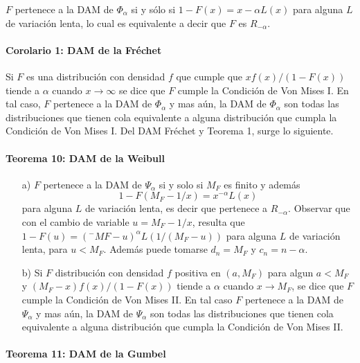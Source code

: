 \documentclass[
  oneside]{book}
\begin{document}
\(F\) pertenece a la DAM de \(\Phi_{\alpha}\) si y sólo si
\(1-F(x)=x-\alpha L(x)\) para alguna \(L\) de variación lenta, lo cual
es equivalente a decir que \(F\) es \(R_{-\alpha}\).

\hypertarget{corolario-1-dam-de-la-fruxe9chet}{%
\paragraph{Corolario 1: DAM de la
Fréchet}\label{corolario-1-dam-de-la-fruxe9chet}}

Si \(F\) es una distribución con densidad \(f\) que cumple que
\(xf(x)/(1-F(x))\) tiende a \(\alpha\) cuando \(x \rightarrow \infty\)
se dice que \(F\) cumple la Condición de Von Mises I. En tal caso, \(F\)
pertenece a la DAM de \(\Phi_{\alpha}\) y mas aún, la DAM de
\(\Phi_{\alpha}\) son todas las distribuciones que tienen cola
equivalente a alguna distribución que cumpla la Condición de Von Mises
I. Del DAM Fréchet y Teorema 1, surge lo siguiente.

\hypertarget{teorema-10-dam-de-la-weibull}{%
\paragraph{Teorema 10: DAM de la
Weibull}\label{teorema-10-dam-de-la-weibull}}

\begin{itemize}
\item [a)] $F$ pertenece a la DAM de $\Psi_{\alpha}$ si y solo si $M_F$ es finito y además $$1-F(M_F -1/x)=x^{-\alpha} L(x)$$ para alguna
$L$ de variación lenta, es decir que pertenece a $R_{-\alpha}$. Observar que con el cambio de variable $u=M_F -1/x$,
resulta que $1-F(u)=(^{-}MF -u)^{\alpha} L(1/(M_F -u))$ para alguna $L$ de variación lenta, para $u< M_F$. Además puede tomarse $d_n= M_F$ y $c_n= n-\alpha$.
\item [b)] Si $F$ distribución con densidad $f$ positiva en $(a,M_F)$ para algun $a< M_F$ y $(M_F -x)f(x)/(1-F(x))$ tiende a $\alpha$ cuando $x\rightarrow M_F$, se dice que $F$ cumple la Condición de Von Mises II. En tal caso $F$ pertenece a la DAM de $\Psi_{\alpha}$ y mas aún, la DAM de $\Psi_{\alpha}$ son todas las distribuciones que tienen cola equivalente a alguna distribución que cumpla la Condición de Von Mises II.
\end{itemize}

\hypertarget{teorema-11-dam-de-la-gumbel}{%
\paragraph{Teorema 11: DAM de la
Gumbel}\label{teorema-11-dam-de-la-gumbel}}
\end{document}
